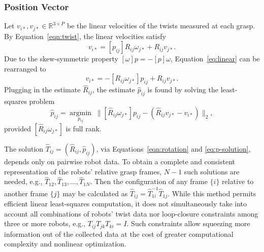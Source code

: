 \documentclass[letterpaper, 10 pt, journal, twoside]{IEEEtran}
\begin{document}
\subsubsection{Position Vector}
Let $v_{i*}, v_{j*} \in \mathbb{R}^{3 \times P}$ be the linear velocities of the twists measured at each grasp. By Equation~\eqref{eqn:twist}, the linear velocities satisfy
\begin{equation}
    v_{i*} = [p_{ij}] R_{ij} \omega_{j*} + R_{ij} v_{j*}.
    \label{eq:linear}
\end{equation}
Due to the skew-symmetric property $[\omega]p=-[p]\omega$, Equation~\eqref{eq:linear} can be rearranged to
\begin{equation}
    v_{i*} = - [ R_{ij} \omega_{j*} ] p_{ij} + R_{ij} v_{j*}.
\end{equation}
Plugging in the estimate $\hat{R}_{ij}$, the estimate $\hat{p}_{ij}$ is found by solving the least-squares problem
\begin{equation}
\hat{p}_{ij} = \underset{p_{ij}}{\operatorname{argmin}} \;  \|
    [ \hat{R}_{ij} \omega_{j*} ] p_{ij} - (\hat{R}_{ij} v_{j*} - v_{i*})\|_2,
    \label{eq:p-solution}
\end{equation}
provided $[\hat{R}_{ij}\omega_{j*}]$ is full rank.



The solution $\hat{T}_{ij} = (\hat{R}_{ij},\hat{p}_{ij})$, via Equations~\eqref{eqn:rotation} and \eqref{eq:p-solution}, depends only on pairwise robot data. To obtain a complete and consistent representation of the robots' relative grasp frames, $N-1$ such solutions are needed, e.g., $\hat{T}_{12}, \hat{T}_{13}, \ldots, \hat{T}_{1N}$. Then the configuration of any frame $\{i\}$ relative to another frame $\{j\}$ may be calculated as $\hat{T}_{ij} = \hat{T}^{-1}_{1i}\hat{T}_{1j}$. While this method permits efficient linear least-squares computation, it does not simultaneously take into account all combinations of robots' twist data nor loop-closure constraints among three or more robots, e.g., $T_{ij}T_{jk}T_{ki} = I$. Such constraints allow squeezing more information out of the collected data at the cost of greater computational complexity and nonlinear optimization.
\end{document}
